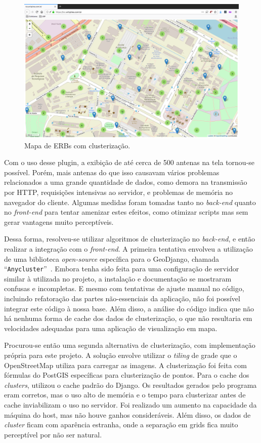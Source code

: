 \documentclass[]{politex}
\begin{document}
\begin{figure}[H]
    \centering
    \includegraphics[width=6in]{imagens/mapa_com_clusters}
    \caption{Mapa de ERBs com clusterização.}
    \label{fig:mapa_com_clusters}
\end{figure}

Com o uso desse plugin, a exibição de até cerca de 500 antenas na tela tornou-se
possível. Porém, mais antenas do que isso causavam vários problemas relacionados
a uma grande quantidade de dados, como demora na transmissão por HTTP,
requisições intensivas ao servidor, e problemas de memória no navegador do
cliente. Algumas medidas foram tomadas tanto no \textit{back-end} quanto no \textit{front-end}
para tentar amenizar estes efeitos, como otimizar scripts mas sem gerar vantagens muito perceptíveis.

Dessa forma, resolveu-se utilizar algoritmos de clusterização no \textit{back-end}, e
então realizar a integração com o \textit{front-end}. A primeira tentativa envolveu a
utilização de uma biblioteca \textit{open-source} específica para o GeoDjango,
chamada ``\texttt{Anycluster}''~\cite{anycluster}. Embora tenha sido feita para uma
configuração de servidor similar à utilizada no projeto, a instalação e
documentação se mostraram confusas e incompletas. E mesmo com tentativas de
ajuste manual no código, incluindo refatoração das partes não-essenciais da
aplicação, não foi possível integrar este código à nossa base. Além disso,
a análise do código indica que não há nenhuma forma de
cache dos dados de clusterização, o que não resultaria em velocidades adequadas
para uma aplicação de visualização em mapa.

Procurou-se então uma segunda alternativa de clusterização, com implementação
própria para este projeto. A solução envolve utilizar o \textit{tiling} de grade que o
OpenStreetMap utiliza para carregar as imagens. A clusterização foi feita com
fórmulas do PostGIS específicas para clusterização de pontos. Para o cache dos
\textit{clusters}, utilizou o cache padrão do Django. Os resultados gerados pelo programa
eram corretos, mas o uso alto de memória e o tempo para clusterizar antes de
cache inviabilizam o uso no servidor. Foi realizado um aumento na capacidade
da máquina do host, mas não houve ganhos consideráveis. Além disso, os dados
de \textit{cluster} ficam com aparência estranha, onde a separação em grids fica muito
perceptível por não ser natural.
\end{document}
